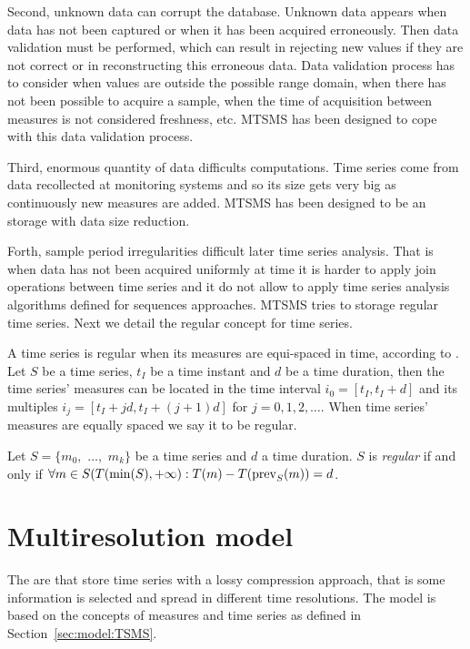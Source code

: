 Second, unknown data can corrupt the database. Unknown data appears
when data has not been captured or when it has been acquired
erroneously. Then data validation must be performed, which can result
in rejecting new values if they are not correct or in reconstructing
this erroneous data.  Data validation process has to consider when
values are outside the possible range domain, when there has not been
possible to acquire a sample, when the time of acquisition between
measures is not considered freshness, etc. MTSMS has been designed to
cope with this data validation process.


Third, enormous quantity of data difficults computations.  Time series
come from data recollected at monitoring systems and so its size gets
very big as continuously new measures are added.  MTSMS has been designed to 
be an storage with data size reduction.


Forth, sample period irregularities difficult later time series
analysis. That is when data has not been acquired uniformly at time it
is harder to apply join operations between time series and it do not
allow to apply time series analysis algorithms defined for sequences
approaches.  MTSMS tries to storage regular time series.  Next we
detail the regular concept for time series.


A time series is regular when its measures are equi-spaced in time,
according to \cite{last:hetland}. Let $S$ be a time series, $t_I$
be a time instant and $d$ be a time duration, then the time
series' measures can be located in the time interval $i_0=[t_I,
t_I+d]$ and its multiples $i_j=[t_I+jd, t_I+(j+1)d]$
for $j=0,1,2,\ldots$. When time series' measures are equally spaced we
say it to be regular.

\begin{definition}
  Let $S=\{m_0,$ $\ldots,$ $m_k\}$ be a time series and $d$ a time
  duration. $S$ is \emph{regular} if and only if $\forall m \in
  S(T(\min(S),+\infty):T(m) - T(\operatorname*{prev}_S(m)) = d$.
\end{definition}





\section{Multiresolution model}
\label{sec:MTSMS}


The  are  that store time series with a lossy
compression approach, that is some information is selected and spread in
different time resolutions. The  model is based on the
concepts of measures and time series as defined in
Section~\ref{sec:model:TSMS}.


